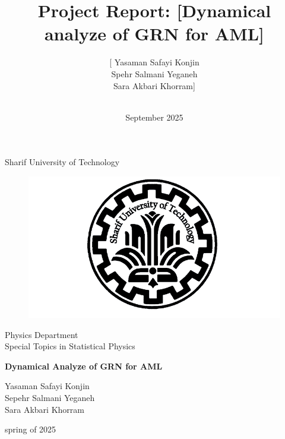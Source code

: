 \documentclass[a4paper,12pt]{article}
\title{Project Report: [Dynamical analyze of GRN for AML]}
\author{[ Yasaman Safayi Konjin \\ Spehr Salmani Yeganeh \\ Sara Akbari Khorram] \\ [physics , sharif university of technology] \\ [Your Email(s)]}
\date{September 2025}
\begin{document}
\begin{titlepage}
	\centering
	{\large Sharif University of Technology\par}
	\begin{figure}
		\centering
		\includegraphics[width=0.5\linewidth]{csm_kisspng-sharif-university-of-technology-university-of-teheran_7c97300984.png}
		\label{fig:placeholder}
	\end{figure}
	{\large Physics Department \\ Special Topics in Statistical Physics \par}
	\vspace{1 cm}
	{\Huge \bfseries Dynamical Analyze of GRN for AML \par}
	\vspace{1cm}
	{\Large Yasaman Safayi Konjin \\ Sepehr Salmani Yeganeh \\ Sara Akbari Khorram \par}
	\vspace{1 cm}
	
	{\large spring of 2025 \par}
\end{titlepage}

\clearpage

\tableofcontents
\clearpage


\end{document}
